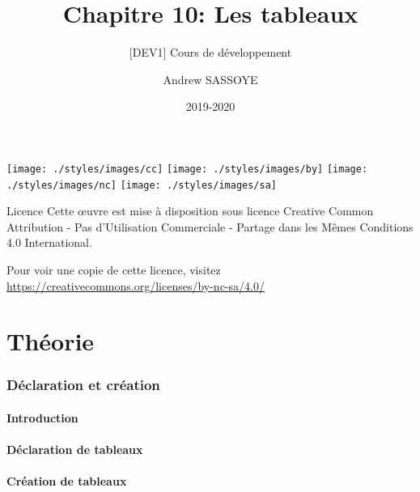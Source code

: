\documentclass{beamer}
\title{Chapitre 10: Les tableaux}
\subtitle{\tiny [DEV1] Cours de développement}
\author{Andrew SASSOYE}
\date{2019-2020}
\begin{document}
	\begin{frame}
		\titlepage
	\end{frame}

	\begin{frame}
		\begin{center}
			\texttt{[image: ./styles/images/cc]}
			\texttt{[image: ./styles/images/by]}
			\texttt{[image: ./styles/images/nc]}
			\texttt{[image: ./styles/images/sa]}
		\end{center}

		\begin{block}{Licence}
			\small Cette \oe uvre est mise à disposition sous licence Creative Common
			Attribution - Pas d\rq Utilisation Commerciale - Partage dans les Mêmes Conditions 4.0 International.
		\end{block}

		\tiny Pour voir une copie de cette licence, visitez
		\href{https://creativecommons.org/licenses/by-nc-sa/4.0/}{https://creativecommons.org/licenses/by-nc-sa/4.0/}
	\end{frame}

    \part{Théorie}
    \frame{\partpage}

    \section{Déclaration et création}\label{sec:declaration-et-creation}
        \subsection{Introduction}\label{subsec:introduction}
            
        \subsection{Déclaration de tableaux}\label{subsec:declaration-de-tableaux}
            
        \subsection{Création de tableaux}\label{subsec:creation-de-tableaux}
            
\end{document}
